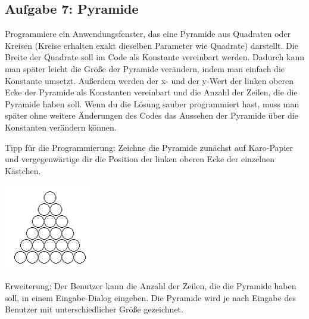 \subsection{Aufgabe 7: Pyramide}

Programmiere ein Anwendungsfenster, das eine Pyramide aus Quadraten oder
Kreisen (Kreise erhalten exakt dieselben Parameter wie Quadrate) darstellt. Die
Breite der Quadrate soll im Code als Konstante vereinbart werden. Dadurch kann
man später leicht die Größe der Pyramide verändern, indem man einfach die
Konstante umsetzt. Außerdem werden der x- und der y-Wert der linken oberen Ecke
der Pyramide als Konstanten vereinbart und die Anzahl der Zeilen, die die
Pyramide haben soll. Wenn du die Lösung sauber programmiert hast, muss man
später ohne weitere Änderungen des Codes das Aussehen der Pyramide über die
Konstanten verändern können.

Tipp für die Programmierung: Zeichne die Pyramide zunächst auf Karo-Papier und
vergegenwärtige dir die Position der linken oberen Ecke der einzelnen Kästchen.

\begin{center}
\includegraphics[width=0.3\textwidth]{./inf/SEKII/08_Java_Eigene_Programme_mit_HJFrame/Aufgabe7.png}
\end{center}


Erweiterung: Der Benutzer kann die Anzahl der Zeilen, die die Pyramide haben
soll, in einem Eingabe-Dialog eingeben. Die Pyramide wird je nach Eingabe des
Benutzer mit unterschiedlicher Größe gezeichnet.
